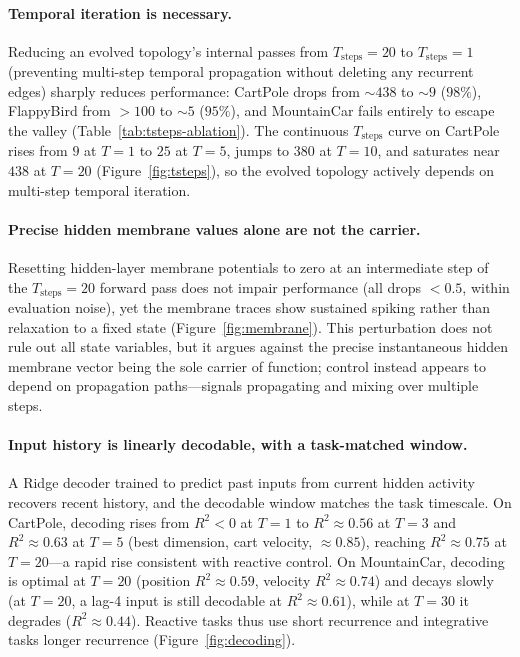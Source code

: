 \documentclass[10pt]{article}
\begin{document}
\paragraph{Temporal iteration is necessary.}
Reducing an evolved topology's internal passes from $T_\text{steps}=20$ to
$T_\text{steps}=1$ (preventing multi-step temporal propagation without deleting
any recurrent edges) sharply reduces performance:
CartPole drops from ${\sim}438$ to ${\sim}9$ ($98\%$), FlappyBird from ${>}100$ to
${\sim}5$ ($95\%$), and MountainCar fails entirely to escape the valley
(Table~\ref{tab:tsteps-ablation}). The continuous $T_\text{steps}$ curve on
CartPole rises from $9$ at $T{=}1$ to $25$ at $T{=}5$, jumps to $380$ at $T{=}10$,
and saturates near $438$ at $T{=}20$ (Figure~\ref{fig:tsteps}), so the evolved
topology actively depends on multi-step temporal iteration.

\paragraph{Precise hidden membrane values alone are not the carrier.}
Resetting hidden-layer membrane potentials to zero at an intermediate step of the
$T_\text{steps}=20$ forward pass does not impair performance (all drops
$<0.5$, within evaluation noise), yet the membrane traces show sustained spiking
rather than relaxation to a fixed state (Figure~\ref{fig:membrane}). This
perturbation does not rule out all state variables, but it argues against the
precise instantaneous hidden membrane vector being the sole carrier of function;
control instead appears to depend on propagation paths---signals
propagating and mixing over multiple steps.

\paragraph{Input history is linearly decodable, with a task-matched window.}
A Ridge decoder trained to predict past inputs from current hidden activity
recovers recent history, and the decodable window matches the task timescale. On
CartPole, decoding rises from $R^2<0$ at $T{=}1$ to $R^2\approx0.56$ at $T{=}3$
and $R^2\approx0.63$ at $T{=}5$ (best dimension, cart velocity, $\approx0.85$),
reaching $R^2\approx0.75$ at $T{=}20$---a rapid rise consistent with reactive
control. On MountainCar, decoding is optimal at $T{=}20$ (position
$R^2\approx0.59$, velocity $R^2\approx0.74$) and decays slowly (at $T{=}20$, a
lag-4 input is still decodable at $R^2\approx0.61$), while at $T{=}30$ it degrades
($R^2\approx0.44$). Reactive tasks thus use short recurrence and integrative tasks
longer recurrence (Figure~\ref{fig:decoding}).
\end{document}
